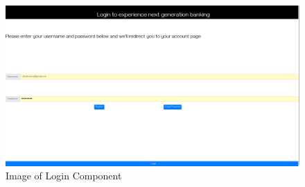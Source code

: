 \begin{figure}[hb]
\includegraphics[width=\textwidth]{img/logincomponent.png}
\caption{Image of Login Component}
\label{fig:Image of login component}
\end{figure}
